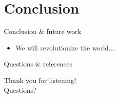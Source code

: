 \documentclass[10pt]{beamer}
\let\olditem\item
\renewcommand{\item}{\setlength{\itemsep}{\fill}\olditem}
\begin{document}
\section{Conclusion}
	
	\begin{frame}{Conclusion \& future work}
	\begin{itemize}
		\item We will revolutionize the world...
	\end{itemize}
	\end{frame}
	
	\begin{frame}{Questions \& references}
	\begin{center}
		\LARGE
		Thank you for listening!\\ \vspace{10pt}Questions?
	\end{center}
		\fontsize{7pt}{8.4}\selectfont
		
		
	\end{frame}
\end{document}
